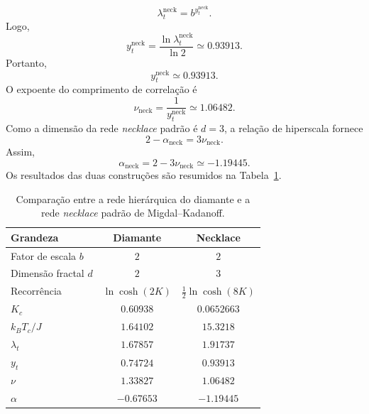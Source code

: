 \documentclass[12pt,a4paper]{article}
\begin{document}
\begin{equation}
    \lambda_t^{\mathrm{neck}}
    =
    b^{y_t^{\mathrm{neck}}}.
\end{equation}
%
Logo,
%
\begin{equation}
    y_t^{\mathrm{neck}}
    =
    \frac{\ln\lambda_t^{\mathrm{neck}}}{\ln2}
    \simeq0.93913.
\end{equation}
%
Portanto,
%
\begin{equation}    y_t^{\mathrm{neck}}\simeq0.93913.
\end{equation}
%
O expoente do comprimento de correlação é
%
\begin{equation}
    \nu_{\mathrm{neck}}
    =
    \frac{1}{y_t^{\mathrm{neck}}}
    \simeq1.06482.
\end{equation}
%
Como a dimensão da rede \textit{necklace} padrão é $d=3$, a
relação de hiperscala fornece
%
\begin{equation}
    2-\alpha_{\mathrm{neck}}
    =
    3\nu_{\mathrm{neck}}.
\end{equation}
%
Assim,
%
\begin{equation}
    \alpha_{\mathrm{neck}}
    =
    2-3\nu_{\mathrm{neck}}
    \simeq-1.19445.
\end{equation}
%
Os resultados das duas construções são resumidos na
Tabela~\ref{tab:comparison_diamond_necklace}.
%
\begin{table}[H]
    \centering
    \caption{
        Comparação entre a rede hierárquica do diamante e a rede
        \textit{necklace} padrão de Migdal--Kadanoff.
    }
    \label{tab:comparison_diamond_necklace}
    \begin{tabular}{lcc}
        \toprule
        Grandeza
        & Diamante
        & Necklace \\
        \midrule
        Fator de escala $b$
        & $2$
        & $2$ \\

        Dimensão fractal $d$
        & $2$
        & $3$ \\

        Recorrência
        & $\ln\cosh(2K)$
        & $\frac12\ln\cosh(8K)$ \\

        $K_c$
        & $0.60938$
        & $0.0652663$ \\

        $k_BT_c/J$
        & $1.64102$
        & $15.3218$ \\

        $\lambda_t$
        & $1.67857$
        & $1.91737$ \\

        $y_t$
        & $0.74724$
        & $0.93913$ \\

        $\nu$
        & $1.33827$
        & $1.06482$ \\

        $\alpha$
        & $-0.67653$
        & $-1.19445$ \\
        \bottomrule
    \end{tabular}
\end{table}
\end{document}
